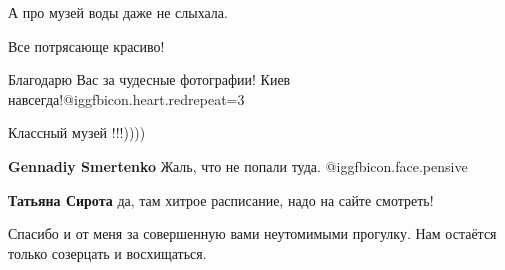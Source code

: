  
 
 
 
 


А про музей воды даже не слыхала.

Все потрясающе красиво!

Благодарю Вас за чудесные фотографии! Киев навсегда!@igg{fbicon.heart.red}{repeat=3}

Классный музей !!!))))

\textbf{Gennadiy Smertenko} Жаль, что не попали туда. @igg{fbicon.face.pensive} 

\textbf{Татьяна Сирота} да, там хитрое расписание, надо на сайте смотреть!


Спасибо и от меня за совершенную вами неутомимыми прогулку. Нам остаётся только
созерцать и восхищаться.
